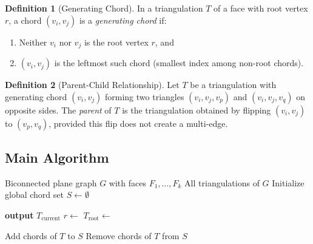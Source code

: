 \documentclass[12pt,a4paper]{article}
\theoremstyle{definition}
\newtheorem{definition}{Definition}
\theoremstyle{remark}
\begin{document}
\begin{definition}[Generating Chord]
\label{def:generating_chord}
In a triangulation $T$ of a face with root vertex $r$, a chord $(v_i, v_j)$ is a \emph{generating chord} if:
\begin{enumerate}
    \item Neither $v_i$ nor $v_j$ is the root vertex $r$, and
    \item $(v_i, v_j)$ is the leftmost such chord (smallest index among non-root chords).
\end{enumerate}
\end{definition}

\begin{definition}[Parent-Child Relationship]
Let $T$ be a triangulation with generating chord $(v_i, v_j)$ forming two triangles $(v_i, v_j, v_p)$ and $(v_i, v_j, v_q)$ on opposite sides. The \emph{parent} of $T$ is the triangulation obtained by flipping $(v_i, v_j)$ to $(v_p, v_q)$, provided this flip does not create a multi-edge.
\end{definition}

\subsection{Main Algorithm}

\begin{algorithm}
\caption{Generate All Triangulations of Biconnected Plane Graph}
\label{alg:main}
\begin{algorithmic}[1]
\Require Biconnected plane graph $G$ with faces $F_1, \ldots, F_k$
\Ensure All triangulations of $G$
\State Initialize global chord set $S \gets \emptyset$
\State {}

        \State \textbf{output} $T_{\text{current}}$ 
        \State \Return
    \EndIf
    \State $r \gets$ 
    \State $T_{\text{root}} \gets$ 
    \State {}
\EndProcedure

    \State Add chords of $T$ to $S$
    \State {}
    \State Remove chords of $T$ from $S$
    
            \State {}
        \EndIf
    \EndFor
\EndProcedure
\end{algorithmic}
\end{algorithm}
\end{document}
